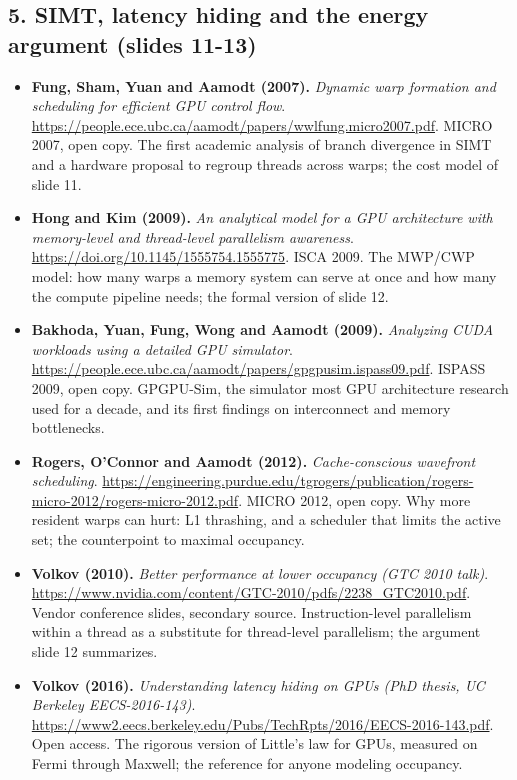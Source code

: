 \subsection*{5. SIMT, latency hiding and the energy argument (slides 11-13)}
\begin{itemize}[leftmargin=1.2em,itemsep=3pt]\sloppy
\item \textbf{Fung, Sham, Yuan and Aamodt (2007).} \textit{Dynamic warp formation and scheduling for efficient GPU control flow}. \url{https://people.ece.ubc.ca/aamodt/papers/wwlfung.micro2007.pdf}. MICRO 2007, open copy. The first academic analysis of branch divergence in SIMT and a hardware proposal to regroup threads across warps; the cost model of slide 11.
\item \textbf{Hong and Kim (2009).} \textit{An analytical model for a GPU architecture with memory-level and thread-level parallelism awareness}. \url{https://doi.org/10.1145/1555754.1555775}. ISCA 2009. The MWP/CWP model: how many warps a memory system can serve at once and how many the compute pipeline needs; the formal version of slide 12.
\item \textbf{Bakhoda, Yuan, Fung, Wong and Aamodt (2009).} \textit{Analyzing CUDA workloads using a detailed GPU simulator}. \url{https://people.ece.ubc.ca/aamodt/papers/gpgpusim.ispass09.pdf}. ISPASS 2009, open copy. GPGPU-Sim, the simulator most GPU architecture research used for a decade, and its first findings on interconnect and memory bottlenecks.
\item \textbf{Rogers, O'Connor and Aamodt (2012).} \textit{Cache-conscious wavefront scheduling}. \url{https://engineering.purdue.edu/tgrogers/publication/rogers-micro-2012/rogers-micro-2012.pdf}. MICRO 2012, open copy. Why more resident warps can hurt: L1 thrashing, and a scheduler that limits the active set; the counterpoint to maximal occupancy.
\item \textbf{Volkov (2010).} \textit{Better performance at lower occupancy (GTC 2010 talk)}. \url{https://www.nvidia.com/content/GTC-2010/pdfs/2238_GTC2010.pdf}. Vendor conference slides, secondary source. Instruction-level parallelism within a thread as a substitute for thread-level parallelism; the argument slide 12 summarizes.
\item \textbf{Volkov (2016).} \textit{Understanding latency hiding on GPUs (PhD thesis, UC Berkeley EECS-2016-143)}. \url{https://www2.eecs.berkeley.edu/Pubs/TechRpts/2016/EECS-2016-143.pdf}. Open access. The rigorous version of Little's law for GPUs, measured on Fermi through Maxwell; the reference for anyone modeling occupancy.

\end{itemize}
